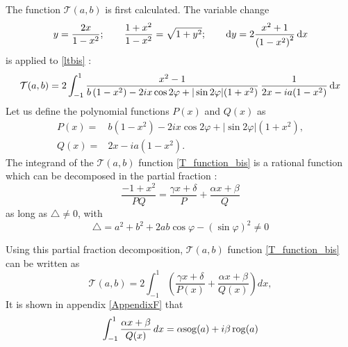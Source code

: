 The function $\mathcal{T}(a,b)$ is first calculated. The variable change
\begin{equation}
\label{variable_change}
y = \dfrac{2x}{1 - x^2};\qquad
\dfrac{1+x^2}{1-x^2} = \sqrt{1+y^2}; \qquad
{\rm d}y = 2\dfrac{x^2+1}{\left( 1 - x^2 \right)^2} \, {\rm d}x
\end{equation}
is applied to \eqref{ltbis} :
\begin{equation}
\label{T_function_bis}
\mathcal{T}(a,b) = 2 \int_{-1}^{1} \dfrac{x^2-1}{ b \, (1-x^2) - 2ix \cos 2\varphi  +|\sin 2\varphi| (1+x^2)} \, \dfrac{1}{2x -i a (1-x^2)} \, {\rm d}x
\end{equation}
Let us define the polynomial functions $P(x)$ and $Q(x)$ as 
\begin{align}
\label{P_pol_function}
P(x) =& b(1-x^2) - 2ix \cos 2\varphi  + |\sin 2\varphi| (1+x^2),\\
\label{Q_pol_function}
Q(x) =& 2x - i a(1-x^2).
\end{align}
The integrand of the $\mathcal{T}(a,b)$ function \eqref{T_function_bis} is a rational function which can be decomposed in the partial fraction :
\begin{equation}
\label{decomposition_elts_simples}
\dfrac{-1+ x^2 }{PQ} = \dfrac{\gamma x + \delta}{P} + \dfrac{\alpha x +\beta}{Q}
\end{equation}
as long as $\triangle \neq 0$, with
\begin{equation}
\triangle =a^2+b^2 +2ab\cos\varphi- (\sin \varphi)^2 \neq 0
\end{equation}

Using this partial fraction decomposition, $\mathcal{T}(a,b)$ function \eqref{T_function_bis} can be written as
\begin{equation}
\label{T_function_bis2}
\mathcal{T}(a,b) = 2  \int_{-1}^{1} \left(  \dfrac{\gamma x + \delta}{ P(x)} + \dfrac{\alpha x + \beta}{Q(x)} \right) dx, 
\end{equation} 
It is shown in appendix \ref{AppendixF} that
\begin{equation}
\label{int1}
\int_{-1}^{1} \dfrac{\alpha x + \beta}{Q(x)} \, dx = \alpha {\rm sog}(a) + i\beta \, {\rm rog}(a) 
\end{equation}

